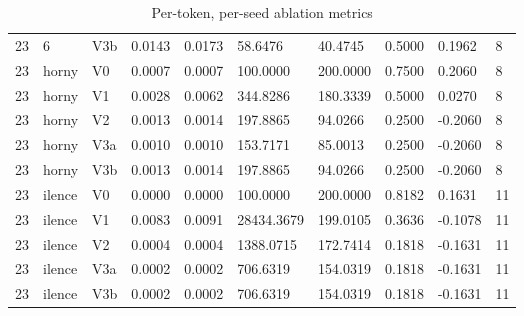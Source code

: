 \begin{table}[htbp]
\begin{tabular}{llllllllll}
23 & 6 & V3b & 0.0143 & 0.0173 & 58.6476 & 40.4745 & 0.5000 & 0.1962 & 8 \\
23 & horny & V0 & 0.0007 & 0.0007 & 100.0000 & 200.0000 & 0.7500 & 0.2060 & 8 \\
23 & horny & V1 & 0.0028 & 0.0062 & 344.8286 & 180.3339 & 0.5000 & 0.0270 & 8 \\
23 & horny & V2 & 0.0013 & 0.0014 & 197.8865 & 94.0266 & 0.2500 & -0.2060 & 8 \\
23 & horny & V3a & 0.0010 & 0.0010 & 153.7171 & 85.0013 & 0.2500 & -0.2060 & 8 \\
23 & horny & V3b & 0.0013 & 0.0014 & 197.8865 & 94.0266 & 0.2500 & -0.2060 & 8 \\
23 & ilence & V0 & 0.0000 & 0.0000 & 100.0000 & 200.0000 & 0.8182 & 0.1631 & 11 \\
23 & ilence & V1 & 0.0083 & 0.0091 & 28434.3679 & 199.0105 & 0.3636 & -0.1078 & 11 \\
23 & ilence & V2 & 0.0004 & 0.0004 & 1388.0715 & 172.7414 & 0.1818 & -0.1631 & 11 \\
23 & ilence & V3a & 0.0002 & 0.0002 & 706.6319 & 154.0319 & 0.1818 & -0.1631 & 11 \\
23 & ilence & V3b & 0.0002 & 0.0002 & 706.6319 & 154.0319 & 0.1818 & -0.1631 & 11 \\
\hline
\end{tabular}
\caption{Per-token, per-seed ablation metrics}
\label{table_ablation_raw}
\end{table}